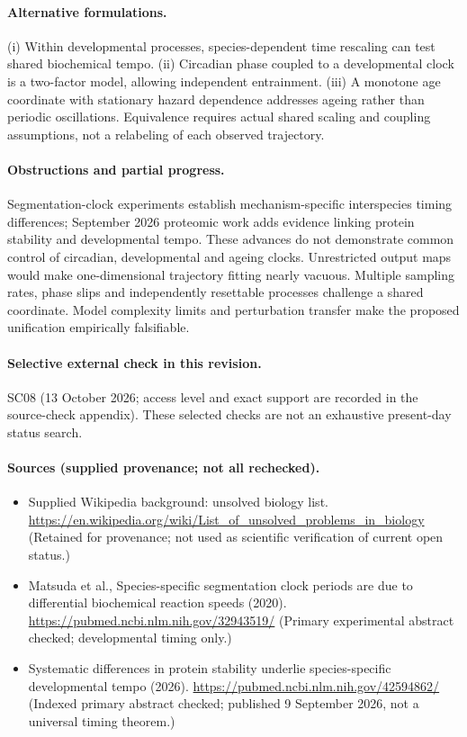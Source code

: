 \documentclass[11pt]{article}
\begin{document}
\paragraph{Alternative formulations.} (i) Within developmental processes, species-dependent time rescaling can test shared biochemical tempo. (ii) Circadian phase coupled to a developmental clock is a two-factor model, allowing independent entrainment. (iii) A monotone age coordinate with stationary hazard dependence addresses ageing rather than periodic oscillations. Equivalence requires actual shared scaling and coupling assumptions, not a relabeling of each observed trajectory.

\paragraph{Obstructions and partial progress.} Segmentation-clock experiments establish mechanism-specific interspecies timing differences; September 2026 proteomic work adds evidence linking protein stability and developmental tempo. These advances do not demonstrate common control of circadian, developmental and ageing clocks. Unrestricted output maps would make one-dimensional trajectory fitting nearly vacuous. Multiple sampling rates, phase slips and independently resettable processes challenge a shared coordinate. Model complexity limits and perturbation transfer make the proposed unification empirically falsifiable.

\paragraph{Selective external check in this revision.} SC08 (13 October 2026; access level and exact support are recorded in the source-check appendix). These selected checks are not an exhaustive present-day status search.

\paragraph{Sources (supplied provenance; not all rechecked).} \begin{itemize}
\item Supplied Wikipedia background: unsolved biology list. \url{https://en.wikipedia.org/wiki/List_of_unsolved_problems_in_biology} (Retained for provenance; not used as scientific verification of current open status.)
\item Matsuda et al., Species-specific segmentation clock periods are due to differential biochemical reaction speeds (2020). \url{https://pubmed.ncbi.nlm.nih.gov/32943519/} (Primary experimental abstract checked; developmental timing only.)
\item Systematic differences in protein stability underlie species-specific developmental tempo (2026). \url{https://pubmed.ncbi.nlm.nih.gov/42594862/} (Indexed primary abstract checked; published 9 September 2026, not a universal timing theorem.)
\end{itemize}
\end{document}
